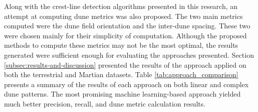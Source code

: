 Along with the crest-line detection algorithms presented in this research, an attempt at computing dune metrics was also proposed. The two main metrics computed were the dune field orientation and the inter-dune spacing. These two were chosen mainly for their simplicity of computation. Although the proposed methods to compute these metrics may not be the most optimal, the results generated were sufficient enough for evaluating the approaches presented. Section \ref{subsec:results-and-discussion} presented the results of the approach applied on both the terrestrial and Martian datasets. Table \ref{tab:approach_comparison} presents a summary of the results of each approach on both linear and complex dune patterns. The most promising machine learning-based approach yielded much better precision, recall, and dune metric calculation results. 
%
